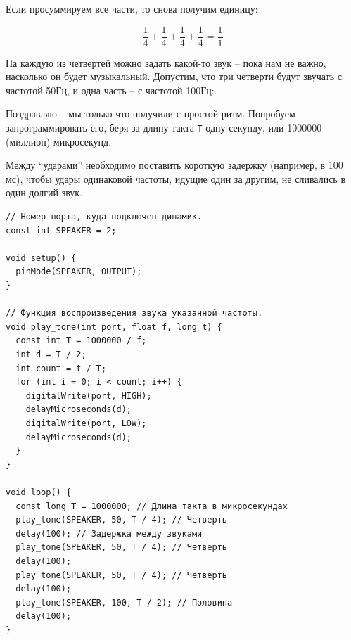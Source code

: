 \documentclass[a4paper,twoside]{book}
\begin{document}
Если просуммируем все части, то снова получим единицу:

\begin{equation}
  \frac{1}{4} + \frac{1}{4} + \frac{1}{4} + \frac{1}{4} = \frac{1}{1}
\end{equation}

На каждую из четвертей можно задать какой-то звук -- пока нам не важно, насколько
он будет музыкальный. Допустим, что три четверти будут звучать с частотой 50Гц,
и одна часть -- с частотой 100Гц:


Поздравляю -- мы только что получили с простой ритм. Попробуем запрограммировать
его, беря за длину такта \texttt{T} одну секунду, или 1000000 (миллион)
микросекунд.

Между ``ударами'' необходимо поставить короткую задержку (например, в 100 мс),
чтобы удары одинаковой частоты, идущие один за другим, не сливались в один
долгий звук.

\begin{verbatim}
// Номер порта, куда подключен динамик.
const int SPEAKER = 2;

void setup() {
  pinMode(SPEAKER, OUTPUT);
}

// Функция воспроизведения звука указанной частоты.
void play_tone(int port, float f, long t) {
  const int T = 1000000 / f;
  int d = T / 2;
  int count = t / T;
  for (int i = 0; i < count; i++) {
    digitalWrite(port, HIGH);
    delayMicroseconds(d);
    digitalWrite(port, LOW);
    delayMicroseconds(d);
  }
}

void loop() {
  const long T = 1000000; // Длина такта в микросекундах
  play_tone(SPEAKER, 50, T / 4); // Четверть
  delay(100); // Задержка между звуками
  play_tone(SPEAKER, 50, T / 4); // Четверть
  delay(100);
  play_tone(SPEAKER, 50, T / 4); // Четверть
  delay(100);
  play_tone(SPEAKER, 100, T / 2); // Половина
  delay(100);
}
\end{verbatim}
\end{document}
